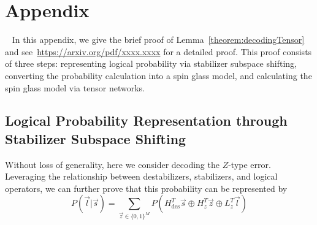 
\section*{Appendix}~\label{sec:appendix}
In this appendix, we give the brief proof of Lemma~\ref{theorem:decodingTensor} and see~\url{https://arxiv.org/pdf/xxxx.xxxx} for a detailed proof. This proof consists of three steps: representing logical probability via stabilizer subspace shifting, converting the probability calculation into a spin glass model, and calculating the spin glass model via tensor networks.


\subsection{Logical Probability Representation through Stabilizer Subspace Shifting}\label{subsec:proofA}
Without loss of generality, here we consider decoding the $Z$-type error. Leveraging the relationship between destabilizers, stabilizers, and logical operators, we can further prove that this probability can be represented by 
\begin{equation}\label{eq:logicalstab}
    P(\vec{l}|\vec{s}) =  \textstyle  \sum_{\vec{z} \in \{0,1\}^M} P(H_{\text{des}}^T \vec{s} \oplus H_z^T \vec{z} \oplus L_z^T \vec{l})
\end{equation}


